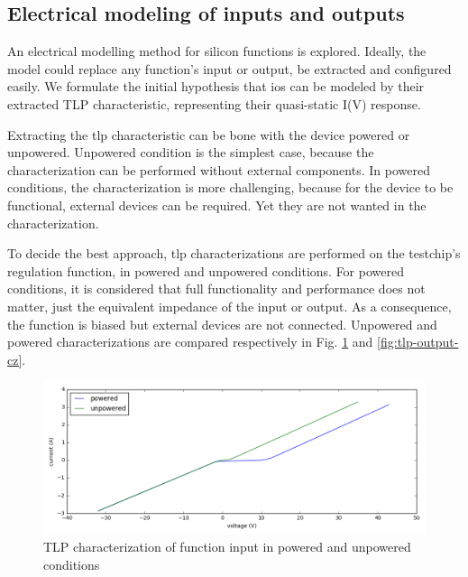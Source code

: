 \subsection{Electrical modeling of inputs and outputs}

An electrical modelling method for silicon functions is explored.
Ideally, the model could replace any function's input or output, be extracted and configured easily.
We formulate the initial hypothesis that \gls{io}s can be modeled by their extracted TLP characteristic, representing their quasi-static I(V) response.

Extracting the \gls{tlp} characteristic can be bone with the device powered or unpowered.
Unpowered condition is the simplest case, because the characterization can be performed without external components.
In powered conditions, the characterization is more challenging, because for the device to be functional, external devices can be required.
Yet they are not wanted in the characterization.

To decide the best approach, \gls{tlp} characterizations are performed on the testchip's regulation function, in powered and unpowered conditions.
For powered conditions, it is considered that full functionality and performance does not matter, just the equivalent impedance of the input or output.
As a consequence, the function is biased but external devices are not connected.
Unpowered and powered characterizations are compared respectively in Fig. \ref{fig:tlp-input-cz} and \ref{fig:tlp-output-cz}.

\begin{figure}[!h]
  \centering
  \includegraphics[width=\textwidth]{src/4/figures/tlp_input_characterization.png}
  \caption{TLP characterization of function input in powered and unpowered conditions}
  \label{fig:tlp-input-cz}
\end{figure}

